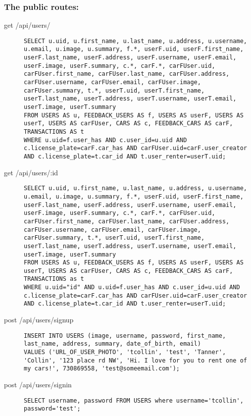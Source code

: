 \documentclass{article}
\begin{document}
\subsubsection{The public routes:}
\begin{description}
\item[get /api/users/] \mbox{}
\begin{lstlisting}[style=sql]
SELECT u.uid, u.first_name, u.last_name, u.address, u.username, u.email, u.image, u.summary, f.*, userF.uid, userF.first_name, userF.last_name, userF.address, userF.username, userF.email, userF.image, userF.summary, c.*, carF.*, carFUser.uid, carFUser.first_name, carFUser.last_name, carFUser.address, carFUser.username, carFUser.email, carFUser.image, carFUser.summary, t.*, userT.uid, userT.first_name, userT.last_name, userT.address, userT.username, userT.email, userT.image, userT.summary
FROM USERS AS u, FEEDBACK_USERS AS f, USERS AS userF, USERS AS userT, USERS AS carFUser, CARS AS c, FEEDBACK_CARS AS carF, TRANSACTIONS AS t
WHERE u.uid=f.user_has AND c.user_id=u.uid AND c.license_plate=carF.car_has AND carFUser.uid=carF.user_creator AND c.license_plate=t.car_id AND t.user_renter=userT.uid;
\end{lstlisting}


\item[get /api/users/:id] \mbox{}
\begin{lstlisting}[style=sql]
SELECT u.uid, u.first_name, u.last_name, u.address, u.username, u.email, u.image, u.summary, f.*, userF.uid, userF.first_name, userF.last_name, userF.address, userF.username, userF.email, userF.image, userF.summary, c.*, carF.*, carFUser.uid, carFUser.first_name, carFUser.last_name, carFUser.address, carFUser.username, carFUser.email, carFUser.image, carFUser.summary, t.*, userT.uid, userT.first_name, userT.last_name, userT.address, userT.username, userT.email, userT.image, userT.summary
FROM USERS AS u, FEEDBACK_USERS AS f, USERS AS userF, USERS AS userT, USERS AS carFUser, CARS AS c, FEEDBACK_CARS AS carF, TRANSACTIONS as t
WHERE u.uid="id" AND u.uid=f.user_has AND c.user_id=u.uid AND c.license_plate=carF.car_has AND carFUser.uid=carF.user_creator AND c.license_plate=t.car_id AND t.user_renter=userT.uid;

\end{lstlisting}

\item[post /api/users/signup] \mbox{}
\begin{lstlisting}[style=sql]
INSERT INTO USERS (image, username, password, first_name, last_name, address, summary, date_of_birth, email)
VALUES ('URL_OF_USER_PHOTO', 'tcollin', 'test', 'Tanner', 'Collin', '123 place rd NW', 'Hi. I love for you to rent one of my cars!', 730869558, 'test@someemail.com');
\end{lstlisting}

\item[post /api/users/signin] \mbox{}
\begin{lstlisting}[style=sql]
SELECT username, password FROM USERS where username='tcollin', password='test';
\end{lstlisting}
\end{description}
\end{document}
